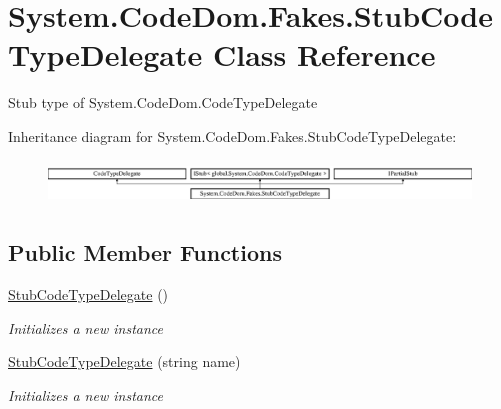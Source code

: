 \hypertarget{class_system_1_1_code_dom_1_1_fakes_1_1_stub_code_type_delegate}{\section{System.\-Code\-Dom.\-Fakes.\-Stub\-Code\-Type\-Delegate Class Reference}
\label{class_system_1_1_code_dom_1_1_fakes_1_1_stub_code_type_delegate}
}


Stub type of System.\-Code\-Dom.\-Code\-Type\-Delegate 


Inheritance diagram for System.\-Code\-Dom.\-Fakes.\-Stub\-Code\-Type\-Delegate\-:\begin{figure}[H]
\begin{center}
\leavevmode
\includegraphics[height=1.163032cm]{class_system_1_1_code_dom_1_1_fakes_1_1_stub_code_type_delegate}
\end{center}
\end{figure}
\subsection*{Public Member Functions}
\begin{DoxyCompactItemize}
\item 
\hyperlink{class_system_1_1_code_dom_1_1_fakes_1_1_stub_code_type_delegate_aabba6f91aabea1e2ce7b2ca7483d1804}{Stub\-Code\-Type\-Delegate} ()
\begin{DoxyCompactList}\small\item\em Initializes a new instance\end{DoxyCompactList}\item 
\hyperlink{class_system_1_1_code_dom_1_1_fakes_1_1_stub_code_type_delegate_ae5141d3f1396bc1ff5cbac1c00e8bd67}{Stub\-Code\-Type\-Delegate} (string name)
\begin{DoxyCompactList}\small\item\em Initializes a new instance\end{DoxyCompactList}\end{DoxyCompactItemize}
